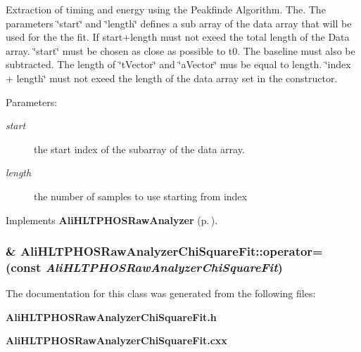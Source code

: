 Extraction of timing and energy using the Peakfinde Algorithm. The. The parameters \char`\"{}start\char`\"{} and \char`\"{}length\char`\"{} defines a sub array of the data array that will be used for the the fit. If start+length must not exeed the total length of the Data array. \char`\"{}start\char`\"{} must be chosen as close as possible to t0. The baseline must also be subtracted. The length of \char`\"{}t\-Vector\char`\"{} and \char`\"{}a\-Vector\char`\"{} mus be equal to length. \char`\"{}index + length\char`\"{} must not exeed the length of the data array set in the constructor. \begin{Desc}
\item[Parameters:]
\begin{description}
\item[{\em start}]the start index of the subarray of the data array. \item[{\em length}]the number of samples to use starting from index \end{description}
\end{Desc}


Implements {\bf Ali\-HLTPHOSRaw\-Analyzer} {\rm (p.\,\pageref{classAliHLTPHOSRawAnalyzer_a14})}.
\subsubsection{\& Ali\-HLTPHOSRaw\-Analyzer\-Chi\-Square\-Fit::operator= (const  {\em Ali\-HLTPHOSRaw\-Analyzer\-Chi\-Square\-Fit})\hspace{0.3cm}{\tt  [inline]}}\label{classAliHLTPHOSRawAnalyzerChiSquareFit_a2}




The documentation for this class was generated from the following files:\begin{CompactItemize}
\item 
{\bf Ali\-HLTPHOSRaw\-Analyzer\-Chi\-Square\-Fit.h}\item 
{\bf Ali\-HLTPHOSRaw\-Analyzer\-Chi\-Square\-Fit.cxx}\end{CompactItemize}
